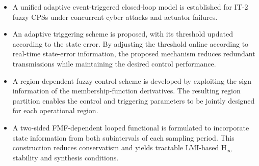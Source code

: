 \documentclass[preprint,review,fleqn,sort&compress,3p]{elsarticle}
\theoremstyle{definition} %
\theoremstyle{definition}%
\begin{document}
	\begin{itemize}
		\item[1)] A unified adaptive event‑triggered closed‑loop model is established for IT‑2 fuzzy CPSs under concurrent cyber attacks and actuator failures.
		\item[2)] An adaptive triggering scheme is proposed, with its threshold updated according to the state error. By adjusting the threshold online according to real-time state-error information, the proposed mechanism reduces redundant transmissions while maintaining the desired control performance.
		\item[3)] A region-dependent fuzzy control scheme is developed by exploiting the sign information of the membership-function derivatives. The resulting region partition enables the control and triggering parameters to be jointly designed for each operational region.
		\item[4)] A two-sided FMF-dependent looped functional is formulated to incorporate state information from both subintervals of each sampling period. This construction reduces conservatism and yields tractable LMI-based $\mathrm{H}_\infty$ stability and synthesis conditions.
	\end{itemize}
	

	
\end{document}
